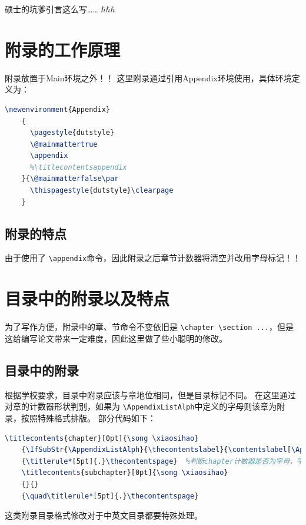 \documentclass[master]{dutthesis} %
\begin{document}
\begin{Main} %
\ifmasterdegree
\begin{Introduction}
    硕士的坑爹引言这么写…… $\hbar\hbar\hbar$
\end{Introduction}
\fi





\end{Main} %
\begin{Appendix}
    \chapter{附录的工作原理}
    附录放置于Main环境之外！！
    这里附录通过引用Appendix环境使用，具体环境定义为：
    \begin{lstlisting}[language=TeX]
	\newenvironment{Appendix}
	{
	  \pagestyle{dutstyle}
	  \@mainmattertrue
	  \appendix
	  %\titlecontentsappendix
	}{\@mainmatterfalse\par
	  \thispagestyle{dutstyle}\clearpage
	}
    \end{lstlisting}


    \section{附录的特点}
    由于使用了 \lstinline|\appendix|命令，因此附录之后章节计数器将清空并改用字母标记！！ 
    \chapter{目录中的附录以及特点}
    为了写作方便，附录中的章、节命令不变依旧是 \lstinline|\chapter \section ...|，但是这给编写论文带来一定难度，因此这里做了些小聪明的修改。
    \section{目录中的附录}
    根据学校要求，目录中附录应该与章地位相同，但是目录标记不同。
    在这里通过对章的计数器形状判别，如果为 \lstinline|\AppendixListAlph|中定义的字母则该章为附录，按照特殊格式排版。 
    部分代码如下：
    \begin{lstlisting}[language=TeX]
	\titlecontents{chapter}[0pt]{\song \xiaosihao}
	{\IfSubStr{\AppendixListAlph}{\thecontentslabel}{\contentslabel[\AppendixTOCName~\thecontentslabel]{0mm}\phantom{\AppendixTOCName~\thecontentslabel}\quad}{\thecontentslabel\quad}}{}
	{\titlerule*[5pt]{.}\thecontentspage}  %判断chapter计数器是否为字母，字母则为附录
	\titlecontents{subchapter}[0pt]{\song \xiaosihao}
	{}{}
	{\quad\titlerule*[5pt]{.}\thecontentspage}
    \end{lstlisting}
    这类附录目录格式修改对于中英文目录都要特殊处理。


\end{Appendix}
\end{document}
